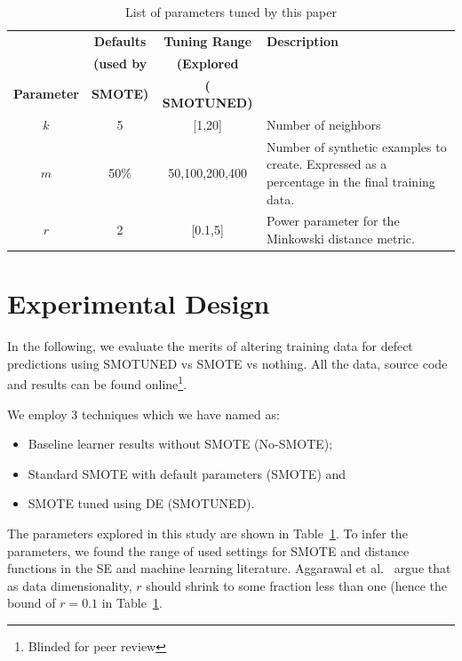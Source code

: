 \documentclass[10pt,conference]{IEEEtran}
\newcommand{\bi}{\begin{itemize}[leftmargin=0.4cm]}
\newcommand{\ei}{\end{itemize}}
\theoremstyle{break}
\theoremstyle{break}
\begin{document}


\begin{table}[!~t]
    \begin{center}
\scriptsize
\begin{tabular}{c|c|c|p{3cm}} 
        \textbf{} & \textbf{Defaults} & \textbf{Tuning Range} & \textbf{Description}\\
          & \textbf{(used by  } & \textbf{(Explored  } &  \\  
        \textbf{Parameter} & \textbf{ SMOTE)} & \textbf{( SMOTUNED)} &  \\
          
          
        \hline
        $k$ & 5 & [1,20] & Number of neighbors \\ 
        \hline
       $m$ & 50\% & {50,100,200,400} & Number of synthetic examples to create. Expressed as a percentage in the final training data. \\ 
        \hline
        $r$ & 2 & [0.1,5] & Power parameter for the Minkowski distance metric.\\
 
\end{tabular}
\end{center}
\caption{List of parameters tuned by this paper}
\label{tb:tuned}
\vspace{-0.4cm}
\end{table}

\section{Experimental Design}
\label{sect:experiment}
 
In the following, we evaluate the merits of altering training
data for defect predictions using SMOTUNED vs SMOTE vs nothing. 
All the data, source code and results can be found online\footnote{Blinded for peer review}.


We employ 3 techniques which we have named as:
\bi
\item
Baseline learner results without SMOTE (No-SMOTE); \item
Standard SMOTE with default parameters (SMOTE) and \item
SMOTE tuned using DE (SMOTUNED).
\ei
The parameters explored in this study are shown in  Table~\ref{tb:tuned}. To infer
the parameters, we found the range of used settings for SMOTE and distance functions
in the   SE and machine learning  literature.  Aggarawal et al.~\cite{aggarwal2001surprising}
argue that as data dimensionality, $r$ should shrink to some fraction less than one
(hence the bound of $r=0.1$ in Table~\ref{tb:tuned}. 
\end{document}
